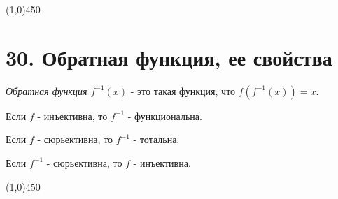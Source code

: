 \documentclass[a4paper,12pt]{article}
\begin{document}
	\begin{center}
		\line(1,0){450}
	\end{center}

	\section*{30. Обратная функция, ее свойства}
	\textit{Обратная функция $f^{-1}(x)$} - это такая функция, что $f(f^{-1}(x)) = x$.

	Если $f$ - инъективна, то $f^{-1}$ - функциональна.

	Если $f$ - сюрьективна, то $f^{-1}$ - тотальна.

	Если $f^{-1}$ - сюрьективна, то $f$ - инъективна.

	\begin{center}
		\line(1,0){450}
	\end{center}
\end{document}
